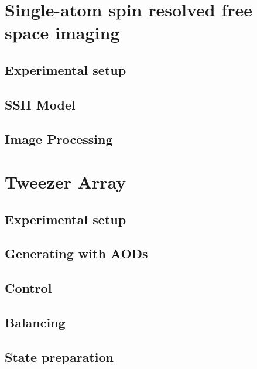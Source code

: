 \documentclass[twoside]{article}
\begin{document}
\newpage


\section{Single-atom spin resolved free space imaging}

\subsection{Experimental setup}


\subsection{SSH Model}


\subsection{Image Processing}




\section{Tweezer Array}

\subsection{Experimental setup}


\subsection{Generating with AODs}


\subsection{Control}


\subsection{Balancing}


\subsection{State preparation}

\end{document}
